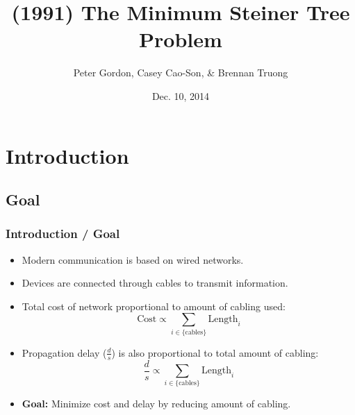 \documentclass{beamer}
\title[The Minimum Steiner Tree Problem]{(1991) The Minimum Steiner Tree Problem}
\author{Peter Gordon, Casey Cao-Son, \& Brennan Truong}
\institute[CSUF] %
{
California State University, Fullerton \\ %
\medskip
Mathematical Modeling, Semester Project \\
\medskip
\textit{peter.gordon@csu.fullerton.edu} \\ 
\textit{dangkhoa27@csu.fullerton.edu} \\
\textit{brennantruong@gmail.com} %
}
\date{Dec. 10, 2014} %
\begin{document}
\section{Introduction}
\begin{frame}
\titlepage %

\end{frame}



\subsection{Goal}
\begin{frame}
\frametitle{Introduction / Goal}
\begin{itemize}
\item<1-> {
	Modern communication is based on wired networks.
}

\item<2-> {
	Devices are connected through cables to transmit information.
}
\item<3-> {
	Total cost of network proportional to amount of cabling used:
	\[
		\text{Cost} \propto \sum_{i \in \{\text{cables}\}} {\text{Length}_i}
	\]
}

\item<4-> {
	Propagation delay (\(\frac{d}{s}\)) is also proportional to total amount of cabling:
	\[
		\frac{d}{s} \propto \sum_{i \in \{\text{cables}\}} {\text{Length}_i}
	\]
}
\item<5-> {
	\textbf{Goal:} Minimize cost and delay by reducing amount of cabling.
}
\end{itemize}
\end{frame}
\end{document}
